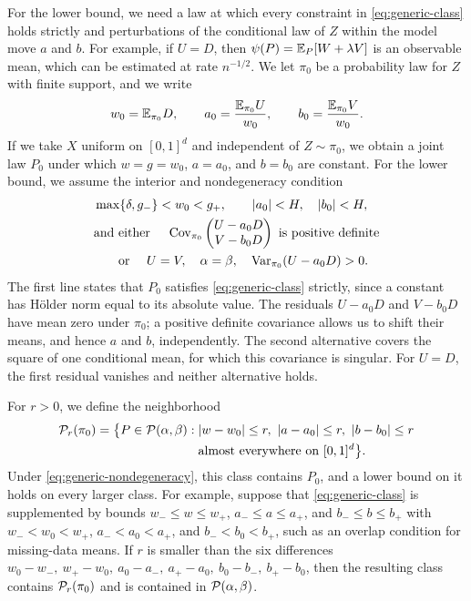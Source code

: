 For the lower bound, we need a law at which every constraint in
\eqref{eq:generic-class} holds strictly and perturbations of the
conditional law of $Z$ within the model move $a$ and $b$. For example,
if $U=D$, then $\psi(P)=\mathbb E_P[W+\lambda V]$ is an observable mean, which
can be estimated at rate $n^{-1/2}$. We let $\pi_0$ be a probability
law for $Z$ with finite support, and we write
\begin{equation}\label{eq:generic-baseline-moments}
 w_0=\mathbb E_{\pi_0}D,\qquad
 a_0=\frac{\mathbb E_{\pi_0}U}{w_0},\qquad
 b_0=\frac{\mathbb E_{\pi_0}V}{w_0}.
\end{equation}
If we take $X$ uniform on $[0,1]^d$ and independent of $Z\sim\pi_0$, we
obtain a joint law $P_0$ under which $w=g=w_0$, $a=a_0$, and $b=b_0$
are constant. For the lower bound, we assume the interior and
nondegeneracy condition
\begin{equation}\label{eq:generic-nondegeneracy}
 \begin{aligned}
 &\max\{\delta,g_-\}<w_0<g_+,\qquad |a_0|<H,\quad |b_0|<H,\\
 &\text{and either }\quad
 \Cov_{\pi_0}\begin{pmatrix}U-a_0D\\V-b_0D\end{pmatrix}
 \text{ is positive definite}\\
 &\phantom{\text{and }}\text{or }\quad
 U=V,\quad \alpha=\beta,\quad \Var_{\pi_0}(U-a_0D)>0.
 \end{aligned}
\end{equation}
The first line states that $P_0$ satisfies \eqref{eq:generic-class}
strictly, since a constant has H\"older norm equal to its absolute value.
The residuals $U-a_0D$ and $V-b_0D$ have mean zero under $\pi_0$;
a positive definite covariance allows us to shift their means, and hence
$a$ and $b$, independently. The second alternative covers the square
of one conditional mean, for which this covariance is singular. For
$U=D$, the first residual vanishes and neither alternative holds.

For $r>0$, we define the neighborhood
\begin{equation}\label{eq:local-class}
 \begin{aligned}
 \mathcal P_r(\pi_0)=\bigl\{P\in\mathcal P(\alpha,\beta):{}&
 |w-w_0|\le r,\ |a-a_0|\le r,\ |b-b_0|\le r\\
 &\text{almost everywhere on }[0,1]^d\bigr\}.
 \end{aligned}
\end{equation}
Under \eqref{eq:generic-nondegeneracy}, this class contains $P_0$, and a
lower bound on it holds on every larger class. For example, suppose
that \eqref{eq:generic-class} is supplemented by
bounds $w_-\le w\le w_+$, $a_-\le a\le a_+$, and $b_-\le b\le b_+$ with
$w_-<w_0<w_+$, $a_-<a_0<a_+$, and $b_-<b_0<b_+$, such as an overlap
condition for missing-data means. If $r$ is smaller than the six
differences $w_0-w_-,\ w_+-w_0,\ a_0-a_-,\ a_+-a_0,\ b_0-b_-,\
b_+-b_0$, then the resulting class contains $\mathcal P_r(\pi_0)$ and is
contained in $\mathcal P(\alpha,\beta)$.

